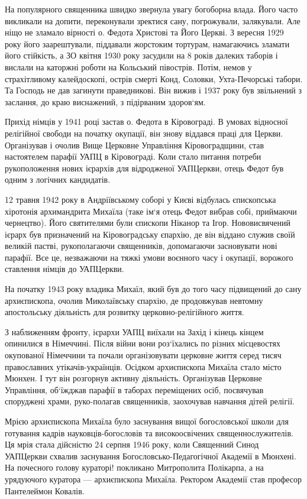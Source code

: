 \documentclass[main.tex]{subfiles}
\begin{document}
На популярного священника швидко звернула увагу богоборна влада. Його часто викликали на допити, переконували зректися сану, погрожували, залякували. Але ніщо не зламало вірності о. Федота Христові та Його Церкві. З вересня 1929 року його заарештували, піддавали жорстоким тортурам, намагаючись зламати його стійкість, а ЗО квітня 1930 року засудили на 8 років далеких таборів і вислали на каторжні роботи на Кольський півострів. Потім, немов у страхітливому калейдоскопі, острів смерті Конд, Соловки, Ухта-Печорські табори. Та Господь не дав загинути праведникові. Він вижив і 1937 року був звільнений з заслання, до краю виснажений, з підірваним здоров`ям.

Прихід німців у 1941 році застав о. Федота в Кіровограді. В умовах відносної релігійної свободи на початку окупації, він знову віддався праці для Церкви. Організував і очолив Вище Церковне Управління Кіровоградщини, став настоятелем парафії УАПЦ в Кіровограді. Коли стало питання потреби рукоположення нових ієрархів для відродженої УАПЦеркви, отець Федот був одним з логічних кандидатів.
 
12 травня 1942 року в Андріївському соборі у Києві відбулась єпископська хіротонія архимандрита Михаїла (таке ім`я отець Федот вибрав собі, приймаючи чернецтво). Його святителями були єпископи Ніканор та Ігор. Нововисвячений ієрарх був призначений на Кіровоградську єпархію, де він віддано служив своїй великій пастві, рукополагаючи священників, допомагаючи засновувати нові парафії. Все це, незважаючи на тяжкі умови воєнного часу і окупації, ворожого ставлення німців до УАПЦеркви.

На початку 1943 року владика Михаїл, який був до того часу підвищений до сану архиєпископа, очолив Миколаївську єпархію, де продовжував невтомну апостольську діяльність для розвитку церковно-релігійного життя.

З наближенням фронту, ієрархи УАПЦ виїхали на Захід і кінець кінцем опинилися в Німеччині. Після війни вони роз`їхались по різних місцевостях окупованої Німеччини та почали організовувати церковне життя серед тисяч православних утікачів-українців. Осідком архиєпископа Михаїла стало місто Мюнхен. І тут він розгорнув активну діяльність. Організував Церковне Управління, об`їжджав парафії в таборах переміщених осіб, посвячував споруджені храми, руко-полагав священників, заохочував навчання дітей релігії.

Мрією архиєпископа Михаїла було заснування вищої богословської школи для готування кадрів науковців-богословів та високоосвічених священнослужителів. Ця мрія стала дійсністю 24 серпня 1946 року, коли Священний Синод УАПЦеркви схвалив заснування Богословсько-Педагогічної Академії в Мюнхені. На почесного голову кураторі! покликано Митрополита Полікарпа, а на урядуючого куратора — архиєпископа Михаїла. Ректором Академії став професор Пантелеймон Ковалів.
\end{document}
